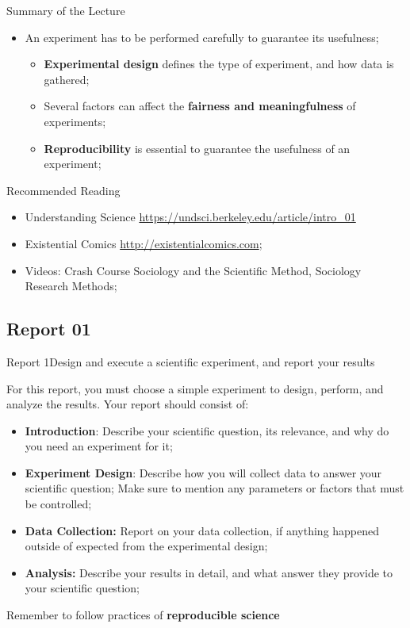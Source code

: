 \documentclass{beamer}
\begin{document}
\begin{CJK}{UTF8}{ipxm}
\begin{frame}{Summary of the Lecture}
\begin{itemize}
    \item An experiment has to be performed carefully to guarantee its usefulness;
    \begin{itemize}
      \item {\bf Experimental design} defines the type of experiment, and how data is gathered;
      \item Several factors can affect the {\bf fairness and meaningfulness} of experiments;
      \item {\bf Reproducibility} is essential to guarantee the usefulness of an experiment;
    \end{itemize}
  \end{itemize}

\end{frame}

\begin{frame}{Recommended Reading}
  \begin{itemize}
    \item Understanding Science \url{https://undsci.berkeley.edu/article/intro_01}
    \item Existential Comics \url{http://existentialcomics.com};
    \item Videos: Crash Course Sociology and the Scientific Method, Sociology Research Methods;
  \end{itemize}
\end{frame}

\subsection{Report 01}
\begin{frame}{Report 1}{Design and execute a scientific experiment, and report your results}

  For this report, you must choose a simple experiment to design, perform, and analyze the results. Your report should consist of:\medskip

  \begin{itemize}
    \item {\bf Introduction}: Describe your scientific question, its relevance, and why do you need an experiment for it;
    \item {\bf Experiment Design}: Describe how you will collect data to answer your scientific question; Make sure to mention any parameters or factors that must be controlled;
    \item {\bf Data Collection:} Report on your data collection, if anything happened outside of expected from the experimental design;
    \item {\bf Analysis:} Describe your results in detail, and what answer they provide to your scientific question;
  \end{itemize}
  \begin{alertblock}{}
    \alert{Remember to follow practices of {\bf reproducible science}}
  \end{alertblock}
\end{frame}


\end{CJK}
\end{document}
